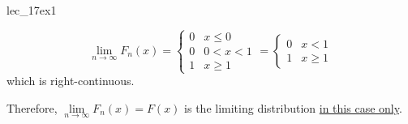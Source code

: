 \begin{Example}{}{lec_17ex1}
\begin{enumerate}[label=(\roman*)]
              \[ \lim\limits_{{n} \to {\infty}} F_n(x)=
                  \begin{cases}
                      0 & x\le 0 \\
                      0 & 0<x<1  \\
                      1 & x\ge 1
                  \end{cases}=\begin{cases}
                      0 & x<1    \\
                      1 & x\ge 1
                  \end{cases} \]
              which is right-continuous.

              Therefore,
              $ \lim\limits_{{n} \to {\infty}} F_n(x) =F(x) $
              is the limiting distribution
              \underline{in this case only}.
    \end{enumerate}
\end{Example}
